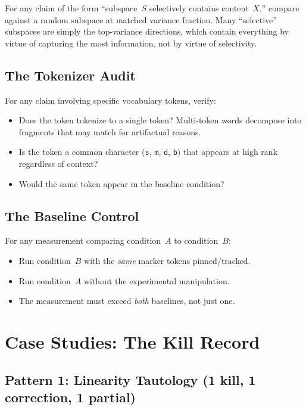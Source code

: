 \documentclass[11pt,a4paper]{article}
\begin{document}
For any claim of the form ``subspace~$S$ selectively contains
content~$X$,'' compare against a random subspace at matched variance
fraction. Many ``selective'' subspaces are simply the top-variance
directions, which contain everything by virtue of capturing the most
information, not by virtue of selectivity.

\subsection{The Tokenizer Audit}

For any claim involving specific vocabulary tokens, verify:
\begin{itemize}[nosep]
    \item Does the token tokenize to a single token? Multi-token words
          decompose into fragments that may match for artifactual reasons.
    \item Is the token a common character (\texttt{s}, \texttt{m},
          \texttt{d}, \texttt{b}) that appears at high rank regardless of
          context?
    \item Would the same token appear in the baseline condition?
\end{itemize}

\subsection{The Baseline Control}

For any measurement comparing condition~$A$ to condition~$B$:
\begin{itemize}[nosep]
    \item Run condition~$B$ with the \emph{same} marker tokens
          pinned/tracked.
    \item Run condition~$A$ without the experimental manipulation.
    \item The measurement must exceed \emph{both} baselines, not just one.
\end{itemize}

\section{Case Studies: The Kill Record}
\label{sec:cases}

\subsection{Pattern 1: Linearity Tautology (1 kill, 1 correction, 1 partial)}
\end{document}
